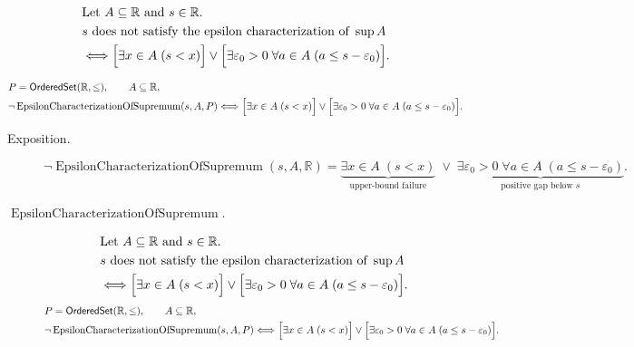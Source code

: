 \begin{remark*}
\[
\begin{aligned}
&\text{Let } A\subseteq\mathbb{R} \text{ and } s\in\mathbb{R}.\\
&s \text{ does not satisfy the epsilon characterization of } \sup A\\
&\Longleftrightarrow
\Bigl[\exists x\in A\;(s<x)\Bigr]
\lor
\Bigl[\exists \varepsilon_0>0\;\forall a\in A\;(a\le s-\varepsilon_0)\Bigr].
\end{aligned}
\]
\end{remark*}

\begin{remark*}
\[
\begin{aligned}
&P=\mathsf{OrderedSet}(\mathbb{R},\leq),\qquad A\subseteq\mathbb{R},\\
&\neg\operatorname{EpsilonCharacterizationOfSupremum}(s,A,P)\Longleftrightarrow
\Bigl[\exists x\in A\;(s<x)\Bigr]
\lor
\Bigl[\exists \varepsilon_0>0\;\forall a\in A\;(a\le s-\varepsilon_0)\Bigr].
\end{aligned}
\]
\end{remark*}

\begin{remark*}
\begin{description}
  \item[Exposition.]
\[
\neg\operatorname{EpsilonCharacterizationOfSupremum}(s,A,\mathbb{R})
=
\underbrace{\exists x\in A\;(s<x)}_{\text{upper-bound failure}}
\;\lor\;
\underbrace{\exists \varepsilon_0>0\;\forall a\in A\;(a\le s-\varepsilon_0)}_{\text{positive gap below }s}.
\]


  \item[\(\operatorname{EpsilonCharacterizationOfSupremum}.\)]
  \[
\begin{aligned}
&\text{Let } A\subseteq\mathbb{R} \text{ and } s\in\mathbb{R}.\\
&s \text{ does not satisfy the epsilon characterization of } \sup A\\
&\Longleftrightarrow
\Bigl[\exists x\in A\;(s<x)\Bigr]
\lor
\Bigl[\exists \varepsilon_0>0\;\forall a\in A\;(a\le s-\varepsilon_0)\Bigr].
\end{aligned}
\]
\[
\begin{aligned}
&P=\mathsf{OrderedSet}(\mathbb{R},\leq),\qquad A\subseteq\mathbb{R},\\
&\neg\operatorname{EpsilonCharacterizationOfSupremum}(s,A,P)\Longleftrightarrow
\Bigl[\exists x\in A\;(s<x)\Bigr]
\lor
\Bigl[\exists \varepsilon_0>0\;\forall a\in A\;(a\le s-\varepsilon_0)\Bigr].
\end{aligned}
\]
\end{description}
\end{remark*}

